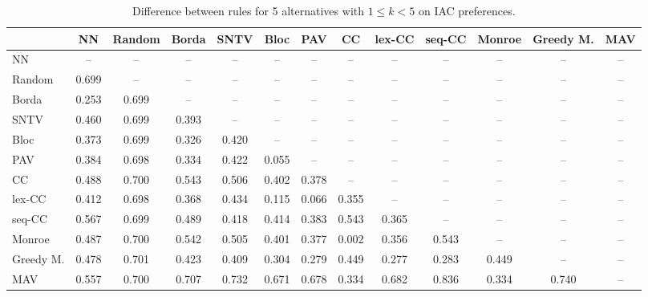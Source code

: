 
\begin{table*}[h!]
\centering
\begin{tabular}{lcccccccccccc}
\toprule
 & NN & Random & Borda & SNTV & Bloc & PAV & CC & lex-CC & seq-CC & Monroe & Greedy M. & MAV \\
\midrule
NN & -- & -- & -- & -- & -- & -- & -- & -- & -- & -- & -- & -- \\
Random & 0.699 & -- & -- & -- & -- & -- & -- & -- & -- & -- & -- & -- \\
Borda & 0.253 & 0.699 & -- & -- & -- & -- & -- & -- & -- & -- & -- & -- \\
SNTV & 0.460 & 0.699 & 0.393 & -- & -- & -- & -- & -- & -- & -- & -- & -- \\
Bloc & 0.373 & 0.699 & 0.326 & 0.420 & -- & -- & -- & -- & -- & -- & -- & -- \\
PAV & 0.384 & 0.698 & 0.334 & 0.422 & 0.055 & -- & -- & -- & -- & -- & -- & -- \\
CC & 0.488 & 0.700 & 0.543 & 0.506 & 0.402 & 0.378 & -- & -- & -- & -- & -- & -- \\
lex-CC & 0.412 & 0.698 & 0.368 & 0.434 & 0.115 & 0.066 & 0.355 & -- & -- & -- & -- & -- \\
seq-CC & 0.567 & 0.699 & 0.489 & 0.418 & 0.414 & 0.383 & 0.543 & 0.365 & -- & -- & -- & -- \\
Monroe & 0.487 & 0.700 & 0.542 & 0.505 & 0.401 & 0.377 & 0.002 & 0.356 & 0.543 & -- & -- & -- \\
Greedy M. & 0.478 & 0.701 & 0.423 & 0.409 & 0.304 & 0.279 & 0.449 & 0.277 & 0.283 & 0.449 & -- & -- \\
MAV & 0.557 & 0.700 & 0.707 & 0.732 & 0.671 & 0.678 & 0.334 & 0.682 & 0.836 & 0.334 & 0.740 & -- \\
\bottomrule
\end{tabular}

\caption{Difference between rules for 5 alternatives with $1 \leq k < 5$ on IAC preferences.}
\end{table*}
